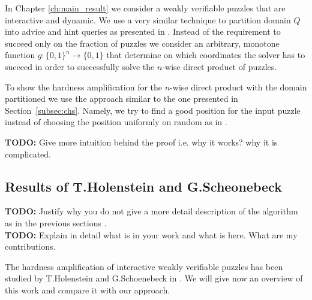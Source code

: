 In Chapter \ref{ch:main_result} we consider a weakly verifiable puzzles that are interactive and dynamic.
We use a very similar technique to partition domain $Q$ into advice and hint queries as presented in \cite{Dodis:2009:SAI:1530441.1530450}.
Instead of the requirement to succeed only on the fraction of puzzles we consider an arbitrary, monotone function $g : \{0,1\}^{n} \rightarrow \{0,1\}$
that determine on which coordinates the solver has to succeed in order to successfully solve the $n$-wise direct product of puzzles.

To show the hardness amplification for the $n$-wise direct product with the domain partitioned we use
the approach similar to the one presented in Section~\ref{subsec:chs}. Namely, we try to find a good position for the input puzzle instead of
choosing the position uniformly on random as in \cite{Dodis:2009:SAI:1530441.1530450}.

\begin{todo}
  \textbf{TODO:} Give more intuition behind the proof i.e. why it works? why it is complicated.
\end{todo}

\subsection{Results of T.Holenstein and G.Scheonebeck}
\begin{todo}
  \textbf{TODO:} Justify why you do not give a more detail description of the
  algorithm as in the previous sections . \\
  \textbf{TODO:} Explain in detail what is in your work and what is here.
  What are my contributions.
\end{todo}

The hardness amplification of interactive weakly verifiable puzzles has been studied by T.Holenstein and G.Schoenebeck in \cite{DBLP:journals/corr/abs-1002-3534}.
We will give now an overview of this work and compare it with our approach.

